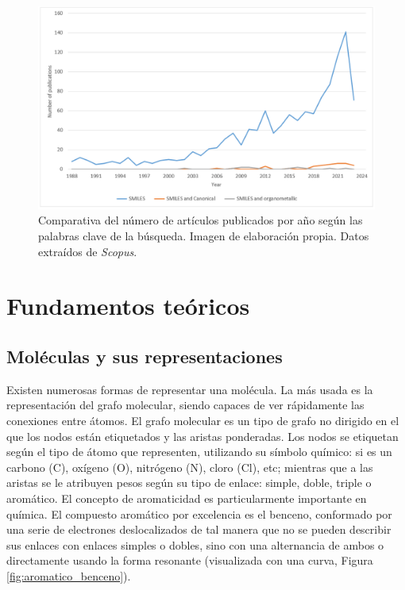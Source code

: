 \begin{figure}[h!]
        \centering
        \includegraphics[scale=0.5]{imagenes/estado_arte/revisionBibliografica.png}
        \caption{Comparativa del número de artículos publicados por año según las palabras clave de la búsqueda. Imagen de elaboración propia. Datos extraídos de \emph{Scopus}.}
        \label{fig:revisionBibliografica}
    \end{figure}


\section{Fundamentos teóricos}

\subsection{Moléculas y sus representaciones}

Existen numerosas formas de representar una molécula. La más usada es la representación del grafo molecular, siendo capaces de ver rápidamente las conexiones entre átomos. El grafo molecular es un tipo de grafo no dirigido en el que los nodos están etiquetados y las aristas ponderadas. Los nodos se etiquetan según el tipo de átomo que representen, utilizando su símbolo químico: si es un carbono (C), oxígeno (O), nitrógeno (N), cloro (Cl), etc; mientras que a las aristas se le atribuyen pesos según su tipo de enlace: simple, doble, triple o aromático. El concepto de aromaticidad es particularmente importante en química. El compuesto aromático por excelencia es el benceno, conformado por una serie de electrones deslocalizados de tal manera que no se pueden describir sus enlaces con enlaces simples o dobles, sino con una alternancia de ambos o directamente usando la forma resonante (visualizada con una curva, Figura \ref{fig:aromatico_benceno}).


